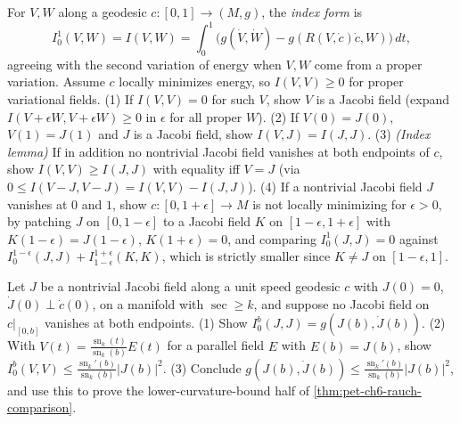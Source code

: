\begin{remark}
  \label{rem:pet-ch6-ex-6-7-24}

  For $V,W$ along a geodesic $c:[0,1]\to(M,g)$, the \emph{index form} is
  \[
    I_0^1(V,W)=I(V,W)=\int_0^1\big(g(\dot V,\dot W)-g(R(V,\dot c)\dot c,W)\big)\,dt,
  \]
  agreeing with the second variation of energy when $V,W$ come from a proper
  variation. Assume $c$ locally minimizes energy, so $I(V,V)\ge0$ for proper
  variational fields. (1) If $I(V,V)=0$ for such $V$, show $V$ is a Jacobi
  field (expand $I(V+\epsilon W,V+\epsilon W)\ge0$ in $\epsilon$ for all
  proper $W$). (2) If $V(0)=J(0)$, $V(1)=J(1)$ and $J$ is a Jacobi field,
  show $I(V,J)=I(J,J)$. (3) \emph{(Index lemma)} If in addition no nontrivial
  Jacobi field vanishes at both endpoints of $c$, show $I(V,V)\ge I(J,J)$
  with equality iff $V=J$ (via $0\le I(V-J,V-J)=I(V,V)-I(J,J)$). (4) If a
  nontrivial Jacobi field $J$ vanishes at $0$ and $1$, show
  $c:[0,1+\epsilon]\to M$ is not locally minimizing for $\epsilon>0$, by
  patching $J$ on $[0,1-\epsilon]$ to a Jacobi field $K$ on $[1-\epsilon,
  1+\epsilon]$ with $K(1-\epsilon)=J(1-\epsilon)$, $K(1+\epsilon)=0$, and
  comparing $I_0^1(J,J)=0$ against $I_0^{1-\epsilon}(J,J)+I_{1-\epsilon}^{1+
  \epsilon}(K,K)$, which is strictly smaller since $K\ne J$ on
  $[1-\epsilon,1]$.
\end{remark}

\begin{remark}
  \label{rem:pet-ch6-ex-6-7-25}

  Let $J$ be a nontrivial Jacobi field along a unit speed geodesic $c$ with
  $J(0)=0$, $\dot J(0)\perp\dot c(0)$, on a manifold with $\sec\ge k$, and
  suppose no Jacobi field on $c|_{[0,b]}$ vanishes at both endpoints. (1)
  Show $I_0^b(J,J)=g(J(b),\dot J(b))$. (2) With $V(t)=\frac{\operatorname{sn}_k(t)}
  {\operatorname{sn}_k(b)}E(t)$ for a parallel field $E$ with $E(b)=J(b)$, show
  $I_0^b(V,V)\le\frac{\operatorname{sn}_k'(b)}{\operatorname{sn}_k(b)}|J(b)|^2$. (3) Conclude
  $g(J(b),\dot J(b))\le\frac{\operatorname{sn}_k'(b)}{\operatorname{sn}_k(b)}|J(b)|^2$, and use this to
  prove the lower-curvature-bound half of
  \cref{thm:pet-ch6-rauch-comparison}.
\end{remark}

